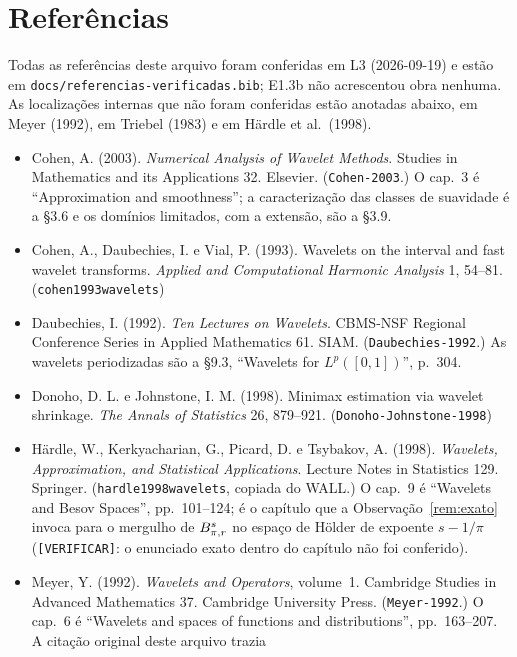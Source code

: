 \documentclass[11pt,a4paper]{article}
\begin{document}
\section*{Referências}
\sloppy

Todas as referências deste arquivo foram conferidas em L3 (2026-09-19) e
estão em \texttt{docs/referencias-verificadas.bib}; E1.3b não acrescentou
obra nenhuma. As localizações internas que não foram conferidas estão
anotadas abaixo, em Meyer (1992), em Triebel (1983) e em Härdle et al.\
(1998).

\begin{itemize}[nosep]
  \item Cohen, A. (2003). \emph{Numerical Analysis of Wavelet Methods}.
    Studies in Mathematics and its Applications 32. Elsevier.
    (\texttt{Cohen-2003}.) O cap.~3 é ``Approximation and smoothness''; a
    caracterização das classes de suavidade é a \S 3.6 e os domínios
    limitados, com a extensão, são a \S 3.9.
  \item Cohen, A., Daubechies, I. e Vial, P. (1993). Wavelets on the
    interval and fast wavelet transforms. \emph{Applied and Computational
    Harmonic Analysis} 1, 54--81. (\texttt{cohen1993wavelets})
  \item Daubechies, I. (1992). \emph{Ten Lectures on Wavelets}. CBMS-NSF
    Regional Conference Series in Applied Mathematics 61. SIAM.
    (\texttt{Daubechies-1992}.) As wavelets periodizadas são a \S 9.3,
    ``Wavelets for $L^{p}([0,1])$'', p.~304.
  \item Donoho, D. L. e Johnstone, I. M. (1998). Minimax estimation via
    wavelet shrinkage. \emph{The Annals of Statistics} 26, 879--921.
    (\texttt{Donoho-Johnstone-1998})
  \item Härdle, W., Kerkyacharian, G., Picard, D. e Tsybakov, A. (1998).
    \emph{Wavelets, Approximation, and Statistical Applications}. Lecture
    Notes in Statistics 129. Springer. (\texttt{hardle1998wavelets},
    copiada do WALL.) O cap.~9 é ``Wavelets and Besov Spaces'', pp.~101--124;
    é o capítulo que a Observação~\ref{rem:exato} invoca para o mergulho de
    $B^{s}_{\pi,r}$ no espaço de Hölder de expoente $s - 1/\pi$
    (\texttt{[VERIFICAR]}: o enunciado exato dentro do capítulo não foi
    conferido).
  \item Meyer, Y. (1992). \emph{Wavelets and Operators}, volume~1. Cambridge
    Studies in Advanced Mathematics 37. Cambridge University Press.
    (\texttt{Meyer-1992}.) O cap.~6 é ``Wavelets and spaces of functions and
    distributions'', pp.~163--207. A citação original deste arquivo trazia

\end{itemize}
\end{document}
